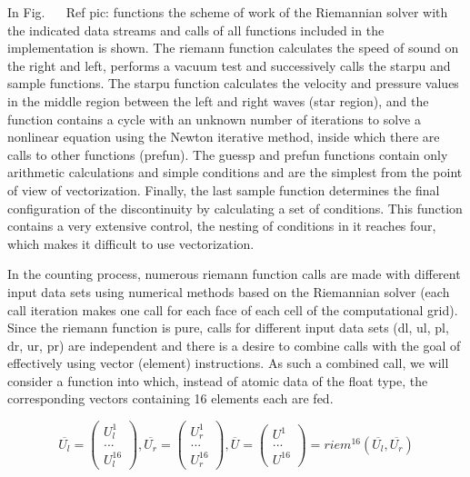 \documentclass[
11pt,%
tightenlines,%
twoside,%
onecolumn,%
nofloats,%
nobibnotes,%
nofootinbib,%
superscriptaddress,%
noshowpacs,%
centertags]%
{revtex4}
\begin{document}
In Fig. ~ \ Ref {pic: functions} the scheme of work of the Riemannian solver with the indicated data streams and calls of all functions included in the implementation is shown. The riemann function calculates the speed of sound on the right and left, performs a vacuum test and successively calls the starpu and sample functions. The starpu function calculates the velocity and pressure values ​​in the middle region between the left and right waves (star region), and the function contains a cycle with an unknown number of iterations to solve a nonlinear equation using the Newton iterative method, inside which there are calls to other functions (prefun). The guessp and prefun functions contain only arithmetic calculations and simple conditions and are the simplest from the point of view of vectorization. Finally, the last sample function determines the final configuration of the discontinuity by calculating a set of conditions. This function contains a very extensive control, the nesting of conditions in it reaches four, which makes it difficult to use vectorization.

In the counting process, numerous riemann function calls are made with different input data sets using numerical methods based on the Riemannian solver (each call iteration makes one call for each face of each cell of the computational grid). Since the riemann function is pure, calls for different input data sets (dl, ul, pl, dr, ur, pr) are independent and there is a desire to combine calls with the goal of effectively using vector (element) instructions. As such a combined call, we will consider a function into which, instead of atomic data of the float type, the corresponding vectors containing 16 elements each are fed.

\begin{equation}\label{eq:riemann_16}
\overline{U_l} = \left( \begin{array}{ccc} U_l^1 \\ ... \\ U_l^{16} \end{array} \right),
\overline{U_r} = \left( \begin{array}{ccc} U_r^1 \\ ... \\ U_r^{16} \end{array} \right),
\overline{U} = \left( \begin{array}{ccc} U^1 \\ ... \\ U^{16} \end{array} \right) = riem^{16}(\overline{U_l}, \overline{U_r})
\end{equation}
\end{document}
